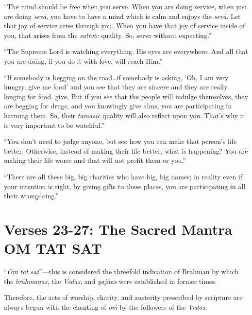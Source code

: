 \enquote{The mind should be free when you serve. When you are doing service, when you are doing \textit{sevā}, you have to have a mind which is calm and enjoys the \textit{sevā}. Let that joy of service arise through you. When you have that joy of service inside of you, that arises from the \textit{sattvic} quality. So, serve without expecting.}

\enquote{The Supreme Lord is watching everything. His eyes are everywhere. And all that you are doing, if you do it with love, will reach Him.}

\enquote{If somebody is begging on the road\ldots if somebody is asking, \enquote{Oh, I am very hungry, give me food} and you see that they are sincere and they are really longing for food, give. But if you see that the people will indulge themselves, they are begging for drugs, and you knowingly give alms, you are participating in harming them. So, their \textit{tamasic} quality will also reflect upon you. That’s why it is very important to be watchful.}

\enquote{You don’t need to judge anyone, but see how you can make that person’s life better. Otherwise, instead of making their life better, what is happening? You are making their life worse and that will not profit them or you.}

\enquote{There are all these big, big charities who have big, big names; in reality even if your intention is right, by giving gifts to these places, you are participating in all their wrongdoing.}

\section{Verses 23-27: The Sacred Mantra OṀ TAT SAT}\label{sec-verses-23-27-the-sacred-mantra-om-tat-sat}

{\enquote{\textit{Oṁ} \textit{tat} \textit{sat}}---this is considered the threefold indication of Brahman by which the \textit{brāhmaṇas}, the \textit{Vedas}, and \textit{yajñas} were established in former times.}

{Therefore, the acts of worship, charity, and austerity prescribed by scripture are always begun with the chanting of \textit{oṁ} by the followers of the \textit{Vedas}.}

